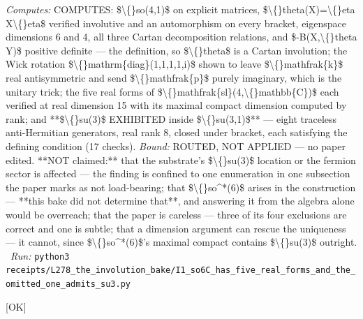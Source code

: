 \begin{description}
\emph{Computes:} COMPUTES: \$\textbackslash\{\}so(4,1)\$ on explicit matrices, \$\textbackslash\{\}theta(X)=\textbackslash\{\}eta X\textbackslash\{\}eta\$ verified involutive and an automorphism on every bracket, eigenspace dimensions 6 and 4, all three Cartan decomposition relations, and \$-B(X,\textbackslash\{\}theta Y)\$ positive definite --- the definition, so \$\textbackslash\{\}theta\$ is a Cartan involution; the Wick rotation \$\textbackslash\{\}mathrm\{diag\}(1,1,1,1,i)\$ shown to leave \$\textbackslash\{\}mathfrak\{k\}\$ real antisymmetric and send \$\textbackslash\{\}mathfrak\{p\}\$ purely imaginary, which is the unitary trick; the five real forms of \$\textbackslash\{\}mathfrak\{sl\}(4,\textbackslash\{\}mathbb\{C\})\$ each verified at real dimension 15 with its maximal compact dimension computed by rank; and **\$\textbackslash\{\}su(3)\$ EXHIBITED inside \$\textbackslash\{\}su(3,1)\$** --- eight traceless anti-Hermitian generators, real rank 8, closed under bracket, each satisfying the defining condition (17 checks).
 \emph{Bound:} ROUTED, NOT APPLIED --- no paper edited. **NOT claimed:** that the substrate's \$\textbackslash\{\}su(3)\$ location or the fermion sector is affected --- the finding is confined to one enumeration in one subsection the paper marks as not load-bearing; that \$\textbackslash\{\}so\textasciicircum{}*(6)\$ arises in the construction --- **this bake did not determine that**, and answering it from the algebra alone would be overreach; that the paper is careless --- three of its four exclusions are correct and one is subtle; that a dimension argument can rescue the uniqueness --- it cannot, since \$\textbackslash\{\}so\textasciicircum{}*(6)\$'s maximal compact contains \$\textbackslash\{\}su(3)\$ outright.
\ \emph{Run:} \texttt{python3 receipts/L278\_the\_involution\_bake/I1\_so6C\_has\_five\_real\_forms\_and\_the\_omitted\_one\_admits\_su3.py}
\item[\label{rcpt:S1_so42_is_not_another_real_form_it_is_the_substrates_own_dual}\texttt{S1\_so42\_is\_not\_another\_real\_form\_it\_is\_the\_substrates\_own\_dual}]\hfill\textsf{[OK]}\\

\end{description}
